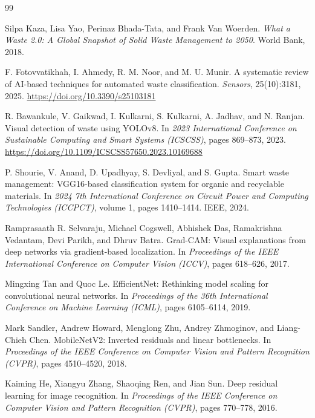 \documentclass[11pt,a4paper]{article}
\begin{document}
	\begin{thebibliography}{99}
		
		Silpa Kaza, Lisa Yao, Perinaz Bhada-Tata, and Frank Van Woerden.
		\textit{What a Waste 2.0: A Global Snapshot of Solid Waste Management to 2050}.
		World Bank, 2018.
		
		F. Fotovvatikhah, I. Ahmedy, R. M. Noor, and M. U. Munir.
		A systematic review of AI-based techniques for automated waste classification.
		\textit{Sensors}, 25(10):3181, 2025.
		\url{https://doi.org/10.3390/s25103181}
		
		R. Bawankule, V. Gaikwad, I. Kulkarni, S. Kulkarni, A. Jadhav, and N. Ranjan.
		Visual detection of waste using YOLOv8.
		In \textit{2023 International Conference on Sustainable Computing and Smart Systems (ICSCSS)}, pages 869--873, 2023.
		\url{https://doi.org/10.1109/ICSCSS57650.2023.10169688}
		
		P. Shourie, V. Anand, D. Upadhyay, S. Devliyal, and S. Gupta.
		Smart waste management: VGG16-based classification system for organic and recyclable materials.
		In \textit{2024 7th International Conference on Circuit Power and Computing Technologies (ICCPCT)}, volume 1, pages 1410--1414. IEEE, 2024.
		
		Ramprasaath R. Selvaraju, Michael Cogswell, Abhishek Das, Ramakrishna Vedantam, Devi Parikh, and Dhruv Batra.
		Grad-CAM: Visual explanations from deep networks via gradient-based localization.
		In \textit{Proceedings of the IEEE International Conference on Computer Vision (ICCV)}, pages 618--626, 2017.
		
		Mingxing Tan and Quoc Le.
		EfficientNet: Rethinking model scaling for convolutional neural networks.
		In \textit{Proceedings of the 36th International Conference on Machine Learning (ICML)}, pages 6105--6114, 2019.
		
		Mark Sandler, Andrew Howard, Menglong Zhu, Andrey Zhmoginov, and Liang-Chieh Chen.
		MobileNetV2: Inverted residuals and linear bottlenecks.
		In \textit{Proceedings of the IEEE Conference on Computer Vision and Pattern Recognition (CVPR)}, pages 4510--4520, 2018.
		
		Kaiming He, Xiangyu Zhang, Shaoqing Ren, and Jian Sun.
		Deep residual learning for image recognition.
		In \textit{Proceedings of the IEEE Conference on Computer Vision and Pattern Recognition (CVPR)}, pages 770--778, 2016.
		

\end{thebibliography}
\end{document}
